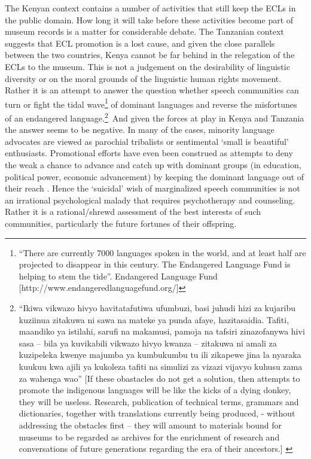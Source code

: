 \documentclass[output=paper,colorlinks,citecolor=brown]{langscibook}
\begin{document}
The Kenyan context contains a number of activities that still keep the ECLs in the public domain. How long it will take before these activities become part of museum records is a matter for considerable debate. The Tanzanian context suggests that ECL promotion is a lost cause, and given the close parallels between the two countries, Kenya cannot be far behind in the relegation of the ECLs to the museum. This is not a judgement on the desirability of linguistic diversity or on the moral grounds of the linguistic human rights movement. Rather it is an attempt to answer the question whether speech communities can turn or fight the tidal wave\footnote{“There are currently 7000 languages spoken in the world, and at least half are projected to disappear in this century. The Endangered Language Fund is helping to stem the tide”. Endangered Language Fund [http://www.endangeredlanguagefund.org/]} of dominant languages and reverse the misfortunes of an endangered language.\footnote{“Ikiwa vikwazo hivyo havitatafutiwa ufumbuzi, basi juhudi hizi za kujaribu kuziinua zitakuwa ni sawa na mateke ya punda afaye, hazitasaidia. Tafiti, maandiko ya istilahi, sarufi na makamusi, pamoja na tafsiri zinazofanywa hivi sasa – bila ya kuvikabili vikwazo hivyo kwanza – zitakuwa ni amali za kuzipeleka kwenye majumba ya kumbukumbu tu ili zikapewe jina la nyaraka kuukuu kwa ajili ya kukoleza tafiti na simulizi za vizazi vijavyo kuhusu zama za wahenga wao” 
[If these obastacles do not get a solution, then attempts to promote the indigenous languages will be like the kicks of a dying donkey, they will  be useless. Research, publication of technical terms, grammars and dictionaries, together with translations currently being produced, - without addressing the obstacles first – they will amount to materials bound for museums to be regarded as archives for the enrichment of research and conversations of future generations regarding the era of their ancestors.] \citep[99]{Madumulla2007}}~And given the forces at play in Kenya and Tanzania the answer seems to be negative. In many of the cases, minority language advocates are viewed as parochial tribalists or sentimental ‘small is beautiful’ enthusiasts. Promotional efforts have even been construed as attempts to deny the weak a chance to advance and catch up with dominant groups (in education, political power, economic advancement) by keeping the dominant language out of their reach \citep{Mkude2002}. Hence the ‘suicidal’ wish of marginalized speech communities is not an irrational psychological malady that requires psychotherapy and counseling. Rather it is a rational\slash shrewd assessment of the best interests of such communities, particularly the future fortunes of their offspring.

% 
% 


{\sloppy\printbibliography[heading=subbibliography,notkeyword=this]}
\end{document}
